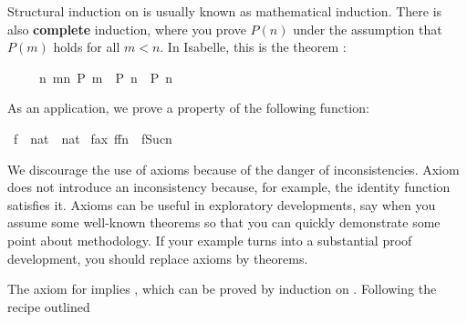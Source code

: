 \begin{isabellebody}
\begin{isamarkuptext}
Structural induction on  is
usually known as mathematical induction. There is also \textbf{complete}
%
induction, where you prove $P(n)$ under the assumption that $P(m)$
holds for all $m<n$. In Isabelle, this is the theorem :
\begin{isabelle}%
\ \ \ \ \ {}{}n{}\ {}m{}n{}\ P\ m\ {}\ P\ n{}\ {}\ P\ n%
\end{isabelle}
As an application, we prove a property of the following
function:%
\end{isamarkuptext}%
\isamarkuptrue%
\isamarkupfalse%
\ f\ {}{}\ {}nat\ {}\ nat{}\isanewline
{}\isamarkupfalse%
\ f{}ax{}\ {}f{}f{}n{}{}\ {}\ f{}Suc{}n{}{}{}%
\begin{isamarkuptext}%
\begin{warn}
We discourage the use of axioms because of the danger of
inconsistencies.  Axiom  does
not introduce an inconsistency because, for example, the identity function
satisfies it.  Axioms can be useful in exploratory developments, say when 
you assume some well-known theorems so that you can quickly demonstrate some
point about methodology.  If your example turns into a substantial proof
development, you should replace axioms by theorems.
\end{warn}\noindent
The axiom for  implies , which can
be proved by induction on \mbox{}. Following the recipe outlined

\end{isamarkuptext}
\end{isabellebody}
